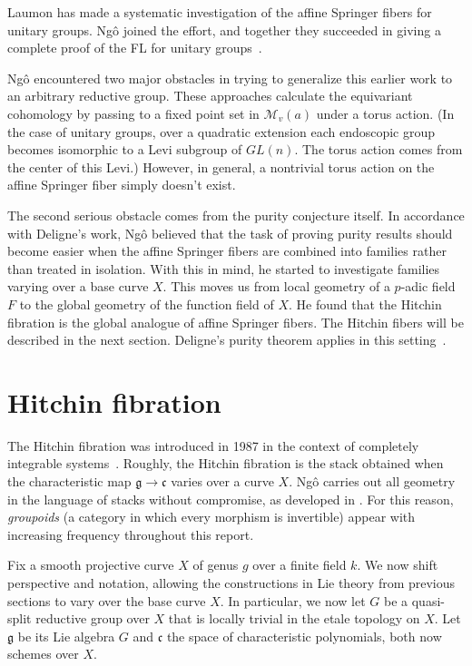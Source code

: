 \documentclass[brochure,english,12pt]{bourbaki}
\theoremstyle{plain}
\def\g{\mathfrak{g}}
\def\cc{\mathfrak{c}}
\def\M{{\mathcal M}}
\begin{document}
Laumon has made a systematic investigation of
the affine Springer fibers for unitary groups.  Ng\^o joined the effort, and together they
succeeded in giving a complete proof of the FL for unitary groups~\cite{LN:08}.

Ng\^o encountered two major obstacles in trying to generalize this
earlier work to an arbitrary reductive group.  These approaches
calculate the equivariant cohomology by passing to a fixed point set in $\M_v(a)$
under a torus action.  (In the case of unitary
groups, over a quadratic extension each endoscopic group becomes
isomorphic to a Levi subgroup of $GL(n)$.  The torus action comes from
the center of this Levi.)  However, in general, a nontrivial torus
action on the affine Springer fiber simply doesn't exist.

The second serious obstacle comes from the purity conjecture itself.
In accordance with Deligne's work, Ng\^o believed that the task of
proving purity results should become easier when the affine Springer
fibers are combined into families rather than treated in isolation.
With this in mind, he started to investigate families varying over a
base curve $X$.  This moves us from local geometry of a $p$-adic
field $F$ to the global geometry of the function field of $X$.  He
found that the Hitchin fibration is the global analogue of affine
Springer fibers.  The Hitchin fibers will be
described in the next section.  Deligne's purity theorem applies in this
setting~\cite{Deligne:Weil2}.



\section{Hitchin fibration}

The Hitchin fibration was introduced in 1987 in the context of
completely integrable systems~\cite{Hitchin:87}.  Roughly, the Hitchin
fibration is the stack obtained when the characteristic map
$\g\to\cc$ varies over a curve $X$.  Ng\^o carries out all geometry
 in the language of stacks without compromise, as developed in
\cite{LMB:2000}.  For this reason, {\it groupoids} (a category in which
every morphism is invertible) appear with increasing frequency throughout this report.

Fix a smooth projective curve $X$ of genus $g$ over a finite field
$k$.  We now shift perspective and notation, allowing the
constructions in Lie theory from previous sections to vary over the
base curve $X$.  In particular, we now let $G$ be a quasi-split
reductive group over $X$ that is locally trivial in the etale topology on
$X$.  Let $\g$ be its Lie algebra $G$ and $\cc$ the space of
characteristic polynomials, both now schemes over $X$.
\end{document}
